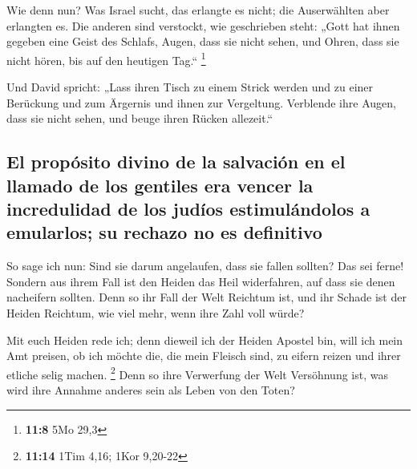  Wie denn nun? Was Israel sucht, das erlangte es nicht;
die Auserwählten aber erlangten es. Die anderen sind verstockt,
 wie geschrieben steht: „Gott hat ihnen gegeben eine Geist
des Schlafs, Augen, dass sie nicht sehen, und Ohren, dass sie nicht
hören, bis auf den heutigen Tag.`` \footnote{\textbf{11:8} 5Mo 29,3}

 Und David spricht: „Lass ihren Tisch zu einem Strick
werden und zu einer Berückung und zum Ärgernis und ihnen zur Vergeltung.
 Verblende ihre Augen, dass sie nicht sehen, und beuge
ihren Rücken allezeit.``

\hypertarget{el-propuxf3sito-divino-de-la-salvaciuxf3n-en-el-llamado-de-los-gentiles-era-vencer-la-incredulidad-de-los-juduxedos-estimuluxe1ndolos-a-emularlos-su-rechazo-no-es-definitivo}{%
\subsection{El propósito divino de la salvación en el llamado de los
gentiles era vencer la incredulidad de los judíos estimulándolos a
emularlos; su rechazo no es
definitivo}\label{el-propuxf3sito-divino-de-la-salvaciuxf3n-en-el-llamado-de-los-gentiles-era-vencer-la-incredulidad-de-los-juduxedos-estimuluxe1ndolos-a-emularlos-su-rechazo-no-es-definitivo}}

 So sage ich nun: Sind sie darum angelaufen, dass sie
fallen sollten? Das sei ferne! Sondern aus ihrem Fall ist den Heiden das
Heil widerfahren, auf dass sie denen nacheifern sollten. 
Denn so ihr Fall der Welt Reichtum ist, und ihr Schade ist der Heiden
Reichtum, wie viel mehr, wenn ihre Zahl voll würde?

 Mit euch Heiden rede ich; denn dieweil ich der Heiden
Apostel bin, will ich mein Amt preisen,  ob ich möchte
die, die mein Fleisch sind, zu eifern reizen und ihrer etliche selig
machen. \footnote{\textbf{11:14} 1Tim 4,16; 1Kor 9,20-22}
 Denn so ihre Verwerfung der Welt Versöhnung ist, was
wird ihre Annahme anderes sein als Leben von den Toten?

